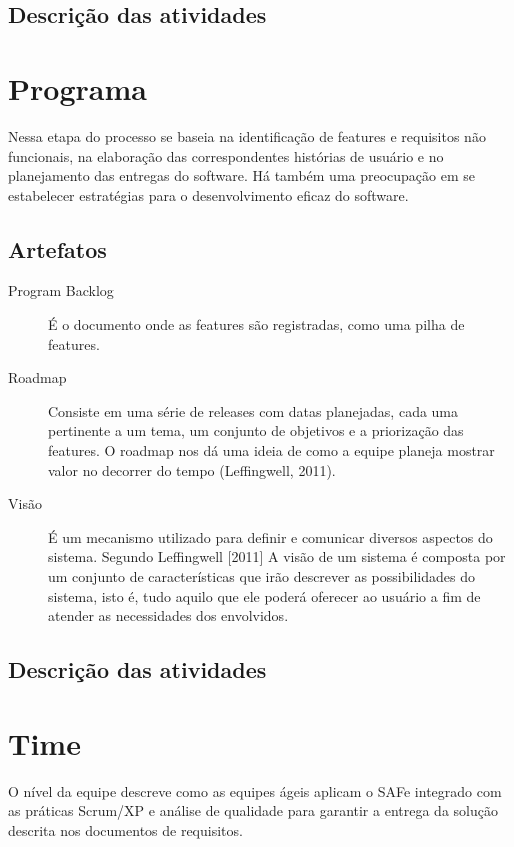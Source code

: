 \subsection{Descrição das atividades}

\section{Programa}
Nessa etapa do processo se baseia na identificação de features e requisitos não funcionais, na elaboração das correspondentes histórias de usuário e no planejamento das entregas do software. Há também uma preocupação em se estabelecer estratégias para o desenvolvimento eficaz do software.

\subsection{Artefatos}
\begin{description}
\item[Program Backlog] É o documento onde as features são registradas, como uma pilha de features.
\item[Roadmap] Consiste em uma série de releases com datas planejadas, cada uma pertinente a um tema, um conjunto de objetivos e a priorização das features. O roadmap nos dá uma ideia de como a equipe planeja mostrar valor no decorrer do tempo (Leffingwell, 2011).
\item[Visão] É um mecanismo utilizado para definir e comunicar diversos aspectos do sistema. Segundo Leffingwell [2011] A visão de um sistema é composta por um conjunto de características que irão descrever as possibilidades do sistema, isto é, tudo aquilo que ele poderá oferecer ao usuário a fim de atender as necessidades dos envolvidos.
\end{description}

\subsection{Descrição das atividades}

\section{Time}
O nível da equipe descreve como as equipes ágeis aplicam o SAFe integrado com as práticas Scrum/XP e análise de qualidade para garantir a entrega da solução descrita nos documentos de requisitos.

